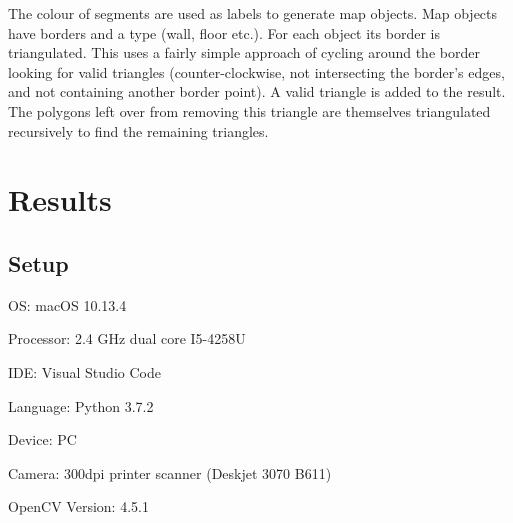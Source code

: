 \documentclass{IEEEtran}
\begin{document}
The colour of segments are used as labels to generate map objects. Map objects have borders and a type (wall, floor etc.). For each object its border is triangulated. This uses a fairly simple approach of cycling around the border looking for valid triangles (counter-clockwise, not intersecting the border's edges, and not containing another border point). A valid triangle is added to the result. The polygons left over from removing this triangle are themselves triangulated recursively to find the remaining triangles. 


\section{Results}

\subsection{Setup}
OS: macOS 10.13.4

Processor: 2.4 GHz dual core I5-4258U

IDE: Visual Studio Code

Language: Python 3.7.2

Device: PC

Camera: 300dpi printer scanner (Deskjet 3070 B611)

OpenCV Version: 4.5.1




\end{document}
